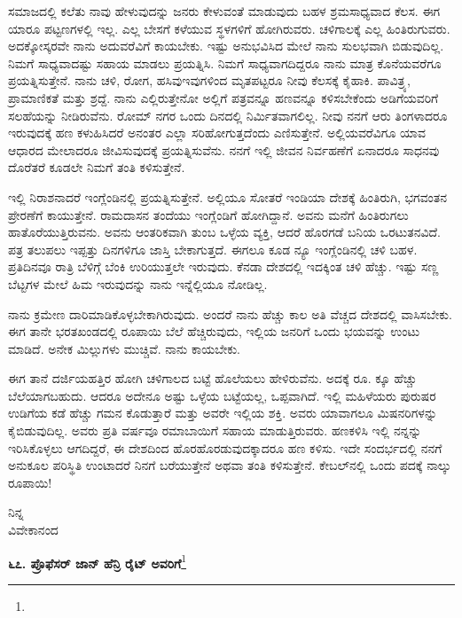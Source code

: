 ಸಮಾಜದಲ್ಲಿ ಕಲೆತು ನಾವು ಹೇಳುವುದನ್ನು ಜನರು ಕೇಳುವಂತೆ ಮಾಡುವುದು ಬಹಳ ಶ್ರಮಸಾಧ್ಯವಾದ ಕೆಲಸ. ಈಗ ಯಾರೂ ಪಟ್ಟಣಗಳಲ್ಲಿ ಇಲ್ಲ. ಎಲ್ಲ ಬೇಸಗೆ ಕಳೆಯುವ ಸ್ಥಳಗಳಿಗೆ ಹೋಗಿರುವರು. ಚಳಿಗಾಲಕ್ಕೆ ಎಲ್ಲ ಹಿಂತಿರುಗುವರು. ಅದಕ್ಕೋಸ್ಕರವೇ ನಾನು ಅದುವರೆವಿಗೆ ಕಾಯಬೇಕು. ಇಷ್ಟು ಅನುಭವಿಸಿದ ಮೇಲೆ ನಾನು ಸುಲಭವಾಗಿ ಬಿಡುವುದಿಲ್ಲ. ನಿಮಗೆ ಸಾಧ್ಯವಾದಷ್ಟು ಸಹಾಯ ಮಾಡಲು ಪ್ರಯತ್ನಿಸಿ. ನಿಮಗೆ ಸಾಧ್ಯವಾಗದಿದ್ದರೂ ನಾನು ಮಾತ್ರ ಕೊನೆಯವರೆಗೂ ಪ್ರಯತ್ನಿಸುತ್ತೇನೆ. ನಾನು ಚಳಿ, ರೋಗ, ಹಸಿವು\enginline{-}ಇವುಗಳಿಂದ ಮೃತಪಟ್ಟರೂ ನೀವು ಕೆಲಸಕ್ಕೆ ಕೈಹಾಕಿ. ಪಾವಿತ್ರ್ಯ, ಪ್ರಾಮಾಣಿಕತೆ ಮತ್ತು ಶ್ರದ್ದೆ. ನಾನು ಎಲ್ಲಿರುತ್ತೇನೋ ಅಲ್ಲಿಗೆ ಪತ್ರವನ್ನೂ ಹಣವನ್ನೂ ಕಳಿಸಬೇಕೆಂದು ಅಡಿಗೆಯವರಿಗೆ ಸಲಹೆಯನ್ನು ನೀಡಿರುವೆನು. ರೋಮ್ ನಗರ ಒಂದು ದಿನದಲ್ಲಿ ನಿರ್ಮಿತವಾಗಲಿಲ್ಲ. ನೀವು ನನಗೆ ಆರು ತಿಂಗಳಾದರೂ ಇರುವುದಕ್ಕೆ ಹಣ ಕಳುಹಿಸಿದರೆ ಅನಂತರ ಎಲ್ಲಾ ಸರಿಹೋಗುತ್ತದೆಂದು ಎಣಿಸುತ್ತೇನೆ. ಅಲ್ಲಿಯವರೆವಿಗೂ ಯಾವ ಆಧಾರದ ಮೇಲಾದರೂ ಜೀವಿಸುವುದಕ್ಕೆ ಪ್ರಯತ್ನಿಸುವೆನು. ನನಗೆ ಇಲ್ಲಿ ಜೀವನ ನಿರ್ವಹಣೆಗೆ ಏನಾದರೂ ಸಾಧನವು ದೊರೆತರೆ ಕೂಡಲೇ ನಿಮಗೆ ತಂತಿ ಕಳಿಸುತ್ತೇನೆ.

ಇಲ್ಲಿ ನಿರಾಶನಾದರೆ ಇಂಗ್ಲೆಂಡಿನಲ್ಲಿ ಪ್ರಯತ್ನಿಸುತ್ತೇನೆ. ಅಲ್ಲಿಯೂ ಸೋತರೆ ಇಂಡಿಯಾ ದೇಶಕ್ಕೆ ಹಿಂತಿರುಗಿ, ಭಗವಂತನ ಪ್ರೇರಣೆಗೆ ಕಾಯುತ್ತೇನೆ. ರಾಮದಾಸನ ತಂದೆಯು ಇಂಗ್ಲೆಂಡಿಗೆ ಹೋಗಿದ್ದಾನೆ. ಅವನು ಮನೆಗೆ ಹಿಂತಿರುಗಲು ಹಾತೊರೆಯುತ್ತಿರುವನು. ಅವನು ಆಂತರಿಕವಾಗಿ ತುಂಬ ಒಳ್ಳೆಯ ವ್ಯಕ್ತಿ, ಆದರೆ ಹೊರಗಡೆ ಬನಿಯ ಒರಟುತನವಿದೆ. ಪತ್ರ ತಲುಪಲು ಇಪ್ಪತ್ತು ದಿನಗಳಿಗೂ ಜಾಸ್ತಿ ಬೇಕಾಗುತ್ತದೆ. ಈಗಲೂ ಕೂಡ ನ್ಯೂ ಇಂಗ್ಲೆಂಡಿನಲ್ಲಿ ಚಳಿ ಬಹಳ. ಪ್ರತಿದಿನವೂ ರಾತ್ರಿ ಬೆಳಿಗ್ಗೆ ಬೆಂಕಿ ಉರಿಯುತ್ತಲೇ ಇರುವುದು. ಕೆನಡಾ ದೇಶದಲ್ಲಿ ಇದಕ್ಕಿಂತ ಚಳಿ ಹೆಚ್ಚು. ಇಷ್ಟು ಸಣ್ಣ ಬೆಟ್ಟಗಳ ಮೇಲೆ ಹಿಮ ಇರುವುದನ್ನು ನಾನು ಇನ್ನೆಲ್ಲಿಯೂ ನೋಡಿಲ್ಲ.

ನಾನು ಕ್ರಮೇಣ ದಾರಿಮಾಡಿಕೊಳ್ಳಬೇಕಾಗಿರುವುದು. ಅಂದರೆ ನಾನು ಹೆಚ್ಚು ಕಾಲ ಅತಿ ವೆಚ್ಚದ ದೇಶದಲ್ಲಿ ವಾಸಿಸಬೇಕು. ಈಗ ತಾನೇ ಭರತಖಂಡದಲ್ಲಿ ರೂಪಾಯಿ ಬೆಲೆ ಹೆಚ್ಚಿರುವುದು, ಇಲ್ಲಿಯ ಜನರಿಗೆ ಒಂದು ಭಯವನ್ನು ಉಂಟು ಮಾಡಿದೆ. ಅನೇಕ ಮಿಲ್ಲುಗಳು ಮುಚ್ಚಿವೆ. ನಾನು ಕಾಯಬೇಕು.

ಈಗ ತಾನೆ ದರ್ಜಿಯಹತ್ತಿರ ಹೋಗಿ ಚಳಿಗಾಲದ ಬಟ್ಟೆ ಹೊಲೆಯಲು ಹೇಳಿರುವೆನು. ಅದಕ್ಕೆ ರೂ.  ಕ್ಕೂ ಹೆಚ್ಚು ಬೆಲೆಯಾಗಬಹುದು. ಆದರೂ ಅದೇನೂ ಅಷ್ಟು ಒಳ್ಳೆಯ ಬಟ್ಟೆಯಲ್ಲ, ಒಪ್ಪವಾಗಿದೆ. ಇಲ್ಲಿ ಮಹಿಳೆಯರು ಪುರುಷರ ಉಡಿಗೆಯ ಕಡೆ ಹೆಚ್ಚು ಗಮನ ಕೊಡುತ್ತಾರೆ ಮತ್ತು ಅವರೇ ಇಲ್ಲಿಯ ಶಕ್ತಿ. ಅವರು ಯಾವಾಗಲೂ ಮಿಷನರಿಗಳನ್ನು ಕೈಬಿಡುವುದಿಲ್ಲ. ಅವರು ಪ್ರತಿ ವರ್ಷವೂ ರಮಾಬಾಯಿಗೆ ಸಹಾಯ ಮಾಡುತ್ತಿರುವರು. ಹಣಕಳಿಸಿ ಇಲ್ಲಿ ನನ್ನನ್ನು ಇರಿಸಿಕೊಳ್ಳಲು ಆಗದಿದ್ದರೆ, ಈ ದೇಶದಿಂದ ಹೊರಹೊರಡುವುದಕ್ಕಾದರೂ ಹಣ ಕಳಿಸು. ಇದೇ ಸಂದರ್ಭದಲ್ಲಿ ನನಗೆ ಅನುಕೂಲ ಪರಿಸ್ಥಿತಿ ಉಂಟಾದರೆ ನಿನಗೆ ಬರೆಯುತ್ತೇನೆ ಅಥವಾ ತಂತಿ ಕಳಿಸುತ್ತೇನೆ. ಕೇಬಲ್‌ನಲ್ಲಿ ಒಂದು ಪದಕ್ಕೆ ನಾಲ್ಕು ರೂಪಾಯಿ!


{\flushright
ನಿನ್ನ\\ವಿವೇಕಾನಂದ\par}

\begin{center}
\textbf{೬೭. ಪ್ರೊಫೆಸರ್ ಜಾನ್ ಹೆನ್ರಿ ರೈಟ್ ಅವರಿಗೆ}\footnote{}
\end{center}

